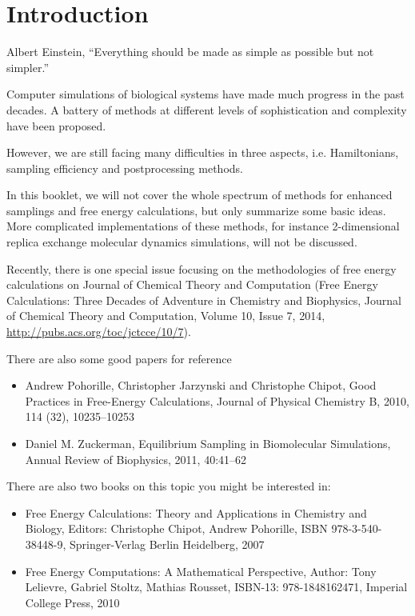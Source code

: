 \chapter{Introduction\label{chapter:introduction}}

\begin{chapquote}{Albert Einstein, %
	}
``Everything should be made as simple as possible but not simpler.''
\end{chapquote}

Computer simulations of biological systems have made much progress in the past decades. A battery of methods at different levels of sophistication and complexity have been proposed.

However, we are still facing many difficulties in three aspects, i.e. Hamiltonians, sampling efficiency and postprocessing methods.\cite{NielsJCTC2014}

In this booklet, we will not cover the whole spectrum of methods for enhanced samplings and free energy calculations, but only summarize some basic ideas. 
More complicated implementations of these methods, for instance 2-dimensional replica exchange molecular dynamics simulations, will not be discussed.

Recently, there is one special issue focusing on the methodologies of free energy calculations on Journal of Chemical Theory and Computation (Free Energy Calculations: Three Decades of Adventure in Chemistry and Biophysics, Journal of Chemical Theory and Computation, Volume 10, Issue 7, 2014, \url{http://pubs.acs.org/toc/jctcce/10/7}). 

There are also some good papers for reference
\begin{itemize}
	\item Andrew Pohorille, Christopher Jarzynski and Christophe Chipot, Good Practices in Free-Energy Calculations, Journal of Physical Chemistry B, 2010, 114 (32), 10235–10253
	\item Daniel M. Zuckerman, Equilibrium Sampling in Biomolecular Simulations, Annual Review of Biophysics, 2011, 40:41–62
\end{itemize}


There are also two books on this topic you might be interested in:
\begin{itemize}
\item Free Energy Calculations: Theory and Applications in Chemistry and Biology, Editors: Christophe Chipot, Andrew Pohorille, ISBN 978-3-540-38448-9, Springer-Verlag Berlin Heidelberg, 2007
\item Free Energy Computations: A Mathematical Perspective, Author: Tony Lelievre, Gabriel Stoltz, Mathias Rousset, ISBN-13: 978-1848162471, Imperial College Press, 2010
\end{itemize}

